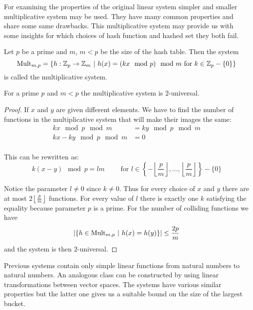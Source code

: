 For examining the properties of the original linear system simpler and smaller multiplicative system may be used. They have many common properties and share some same drawbacks. This multiplicative system may provide us with some insights for which choices of hash function and hashed set they both fail.

\begin{definition}
Let $p$ be a prime and $m$, $m < p$ be the size of the hash table. Then the system \[ \mathrm{Mult}_{m, p} = \lbrace h:\mathbb{Z}_p \rightarrow \mathbb{Z}_m \ | \  h(x) = (kx \mod p) \mod m \text{ for } k \in \mathbb{Z}_p - \{0\} \rbrace \] is called the multiplicative system.
\end{definition}

\begin{theorem}
For a prime $p$ and $m < p$ the multiplicative system is $2$-universal.
\end{theorem}
\begin{proof}
If $x$ and $y$ are given different elements. We have to find the number of functions in the multiplicative system that will make their images the same:
\begin{displaymath}
\begin{split}
kx \mod p \mod m & = ky \mod p \mod m \\
kx - ky \mod p \mod m & = 0 \\
\end{split}
\end{displaymath}

This can be rewritten as:
\begin{displaymath}
k(x - y) \mod p = l m \qquad \text{ for  } l \in \left\lbrace -\left\lfloor\frac{p}{m}\right\rfloor, \dots, \left\lfloor\frac{p}{m}\right\rfloor \right\rbrace - \{0\}
\end{displaymath}

Notice the parameter $l \neq 0$ since $k \neq 0$. Thus for every choice of $x$ and $y$ there are at most $2\left\lfloor\frac{p}{m}\right\rfloor$ functions. For every value of $l$ there is exactly one $k$ satisfying the equality because parameter $p$ is a prime. For the number of colliding functions we have \[ | \lbrace h \in \mathrm{Mult}_{m,p} \ | \  h(x) = h(y) \rbrace | \leq \frac{2p}{m} \] and the system is then $2$-universal.
\end{proof}

Previous systems contain only simple linear functions from natural numbers to natural numbers. An analogous class can be constructed by using linear transformations between vector spaces. The systems have various similar properties but the latter one gives us a suitable bound on the size of the largest bucket.

